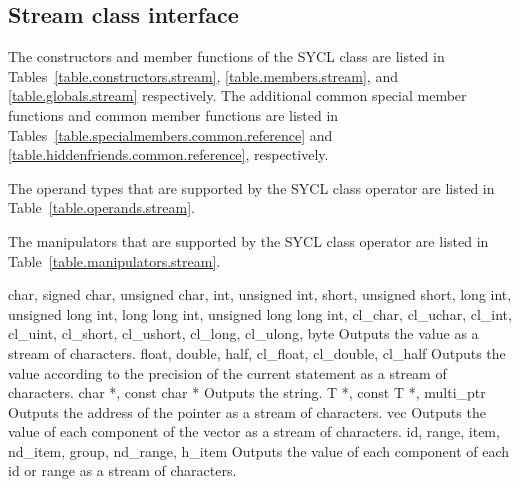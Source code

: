 \subsection{Stream class interface}

The constructors and member functions of the SYCL  class are listed in Tables~\ref{table.constructors.stream}, \ref{table.members.stream}, and \ref{table.globals.stream} respectively. The additional common special member functions and common member functions are listed in Tables~\ref{table.specialmembers.common.reference} and \ref{table.hiddenfriends.common.reference}, respectively.

The operand types that are supported by the SYCL  class  operator are listed in Table~\ref{table.operands.stream}.

The manipulators that are supported by the SYCL  class  operator are listed in Table~\ref{table.manipulators.stream}.



\addRow
{
  char, signed char, unsigned char, int, unsigned int, short, unsigned short, long int, unsigned long int, long long int, unsigned long long int, cl_char, cl_uchar, cl_int, cl_uint, cl_short, cl_ushort, cl_long, cl_ulong, byte
}
{
  Outputs the value as a stream of characters.
}
\addRow
{
  float, double, half, cl_float, cl_double, cl_half
}
{
  Outputs the value according to the precision of the current statement as a stream of characters.
}
\addRow
{
  char *, const char *
}
{
  Outputs the string.
}
\addRow
{
  T *, const T *, multi_ptr
}
{
  Outputs the address of the pointer as a stream of characters.
}
\addRow
{
  vec
}
{
  Outputs the value of each component of the vector as a stream of characters.
}
\addRow
{
  id, range, item, nd_item, group, nd_range, h_item
}
{
  Outputs the value of each component of each id or range as a stream of characters.
}
\completeTable

